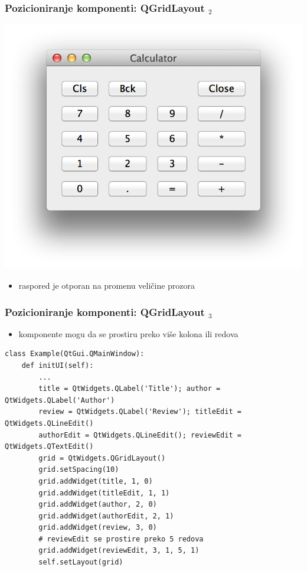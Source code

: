 \documentclass[utf8,compress]{beamer}
\begin{document}
\begin{frame}[fragile]
  \frametitle{Pozicioniranje komponenti: QGridLayout $_2$}
\begin{center}
\includegraphics[scale=0.5]{pyqt08.png}
\end{center}
  \begin{itemize}
    \item raspored je otporan na promenu veličine prozora
  \end{itemize}
\end{frame}

\begin{frame}[fragile,shrink=20]
  \frametitle{Pozicioniranje komponenti: QGridLayout $_3$}
  \begin{itemize}
    \item komponente mogu da se prostiru preko više kolona ili redova
  \end{itemize}
\begin{verbatim}
class Example(QtGui.QMainWindow):
    def initUI(self):
        ...
        title = QtWidgets.QLabel('Title'); author = QtWidgets.QLabel('Author')
        review = QtWidgets.QLabel('Review'); titleEdit = QtWidgets.QLineEdit()
        authorEdit = QtWidgets.QLineEdit(); reviewEdit = QtWidgets.QTextEdit()
        grid = QtWidgets.QGridLayout()
        grid.setSpacing(10)
        grid.addWidget(title, 1, 0)
        grid.addWidget(titleEdit, 1, 1)
        grid.addWidget(author, 2, 0)
        grid.addWidget(authorEdit, 2, 1)
        grid.addWidget(review, 3, 0)
        # reviewEdit se prostire preko 5 redova
        grid.addWidget(reviewEdit, 3, 1, 5, 1)
        self.setLayout(grid)
\end{verbatim}
\end{frame}
\end{document}
